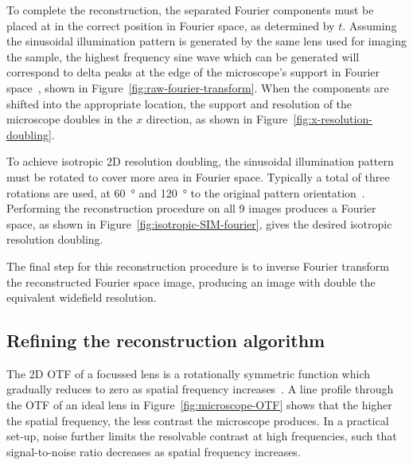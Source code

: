 To complete the reconstruction, the separated Fourier components must be placed at in the correct position in Fourier space, as determined by $t$. 
Assuming the sinusoidal illumination pattern is generated by the same lens used for imaging the sample, the highest frequency sine wave which can be generated will correspond to delta peaks at the edge of the microscope's support in Fourier space~\cite{heintzmann2017super}, shown in Figure~\ref{fig:raw-fourier-transform}. 
When the components are shifted into the appropriate location, the support and resolution of the microscope doubles in the $x$ direction, as shown in Figure~\ref{fig:x-resolution-doubling}. 

To achieve isotropic 2D resolution doubling, the sinusoidal illumination pattern must be rotated to cover more area in Fourier space. 
Typically a total of three rotations are used, at \SI{60}{\degree} and \SI{120}{\degree} to the original pattern orientation~\cite{gustafsson2000surpassing, chang2009isotropic}. 
Performing the reconstruction procedure on all 9 images produces a Fourier space, as shown in Figure~\ref{fig:isotropic-SIM-fourier}, gives the desired isotropic resolution doubling. 

The final step for this reconstruction procedure is to inverse Fourier transform the reconstructed Fourier space image, producing an image with double the equivalent widefield resolution. 


\subsection{Refining the reconstruction algorithm}
The 2D OTF of a focussed lens is a rotationally symmetric function which gradually reduces to zero as spatial frequency increases~\cite{williams2002introduction}. 
A line profile through the OTF of an ideal lens in Figure~\ref{fig:microscope-OTF} shows that the higher the spatial frequency, the less contrast the microscope produces.
In a practical set-up, noise further limits the resolvable contrast at high frequencies, such that signal-to-noise ratio decreases as spatial frequency increases. 

